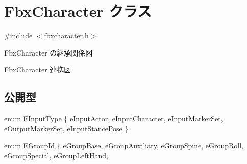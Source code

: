 \hypertarget{class_fbx_character}{}\section{Fbx\+Character クラス}
\label{class_fbx_character}


{\ttfamily \#include $<$fbxcharacter.\+h$>$}



Fbx\+Character の継承関係図


Fbx\+Character 連携図
\subsection*{公開型}
\begin{DoxyCompactItemize}
\item 
enum \hyperlink{class_fbx_character_a0c2ca4f8cab9c76a83b0e207f3ae8ea1}{E\+Input\+Type} \{ \newline
\hyperlink{class_fbx_character_a0c2ca4f8cab9c76a83b0e207f3ae8ea1a98809ebdc96b0ea702b3b4d95645d979}{e\+Input\+Actor}, 
\hyperlink{class_fbx_character_a0c2ca4f8cab9c76a83b0e207f3ae8ea1a7c8992646a1efa0ab2466ade02882056}{e\+Input\+Character}, 
\hyperlink{class_fbx_character_a0c2ca4f8cab9c76a83b0e207f3ae8ea1a1efb10b04b923759939d5a29b6303df2}{e\+Input\+Marker\+Set}, 
\hyperlink{class_fbx_character_a0c2ca4f8cab9c76a83b0e207f3ae8ea1a53ed1b1cba872fadf4c142d16ea78d8a}{e\+Output\+Marker\+Set}, 
\newline
\hyperlink{class_fbx_character_a0c2ca4f8cab9c76a83b0e207f3ae8ea1ab1c34b5219365fa2b43971357beb4abc}{e\+Input\+Stance\+Pose}
 \}
\item 
enum \hyperlink{class_fbx_character_aa04f2d3cc99d77fe7b9d2066fc9f255e}{E\+Group\+Id} \{ \newline
\hyperlink{class_fbx_character_aa04f2d3cc99d77fe7b9d2066fc9f255ea8ce673cb9b2b2f788df639135ed884ab}{e\+Group\+Base}, 
\hyperlink{class_fbx_character_aa04f2d3cc99d77fe7b9d2066fc9f255ea9171682970599aa853be7004de71d9f8}{e\+Group\+Auxiliary}, 
\hyperlink{class_fbx_character_aa04f2d3cc99d77fe7b9d2066fc9f255ea8100ebb4b6e4a5315494c308fe9e7fff}{e\+Group\+Spine}, 
\hyperlink{class_fbx_character_aa04f2d3cc99d77fe7b9d2066fc9f255ead382e8164294740140083541fdde208a}{e\+Group\+Roll}, 
\newline
\hyperlink{class_fbx_character_aa04f2d3cc99d77fe7b9d2066fc9f255ea70e37c62a9a5fb9066926cfeb5ee0622}{e\+Group\+Special}, 
\hyperlink{class_fbx_character_aa04f2d3cc99d77fe7b9d2066fc9f255ead0dd6dcedb360f19cf8ade55b7f8a80a}{e\+Group\+Left\+Hand}, 

\end{DoxyCompactItemize}
